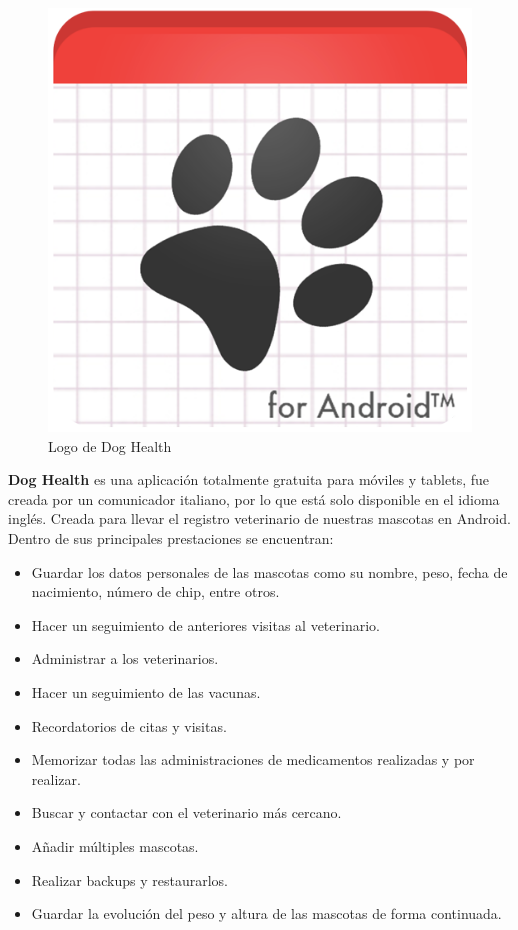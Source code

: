 \begin{figure}[h!]
	\begin{center}
		\includegraphics[scale=0.12]{Graphics/images/LogodeDogHealth.png}
		\caption{Logo de Dog Health}
		\label{fig:dh}
		
	\end{center}
\end{figure}


\textbf{Dog Health} es una aplicación totalmente gratuita para móviles y tablets, fue creada por un comunicador italiano, por lo que está solo disponible en el idioma inglés. Creada para llevar el registro veterinario de nuestras mascotas en Android. Dentro de sus principales prestaciones se encuentran:

\begin{itemize}
	
	
	\item	Guardar los datos personales de las mascotas como su nombre, peso, fecha de nacimiento, número de chip, entre otros.
	\item	Hacer un seguimiento de anteriores visitas al veterinario.
	\item	Administrar a los veterinarios.
	\item	Hacer un seguimiento de las vacunas.
	\item	Recordatorios de citas y visitas.
	\item	Memorizar todas las administraciones de medicamentos realizadas y por realizar.
	\item Buscar y contactar con el veterinario más cercano.
	\item	Añadir múltiples mascotas.
	\item	Realizar backups y restaurarlos.
	\item	Guardar la evolución del peso y altura de las mascotas de forma continuada.
	
\end{itemize}


